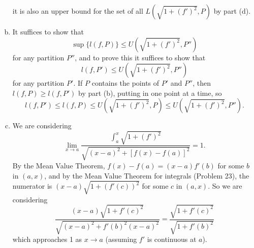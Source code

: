 \documentclass{article}
\begin{document}
\begin{enumerate}[(a)]
    it is also an upper bound for the set of all $L(\sqrt{1 + (f')^2}, P)$ by
    part (d).
  \item It suffices to show that \[
      \sup\{l(f, P)\} \leq U(\sqrt{1 + (f')^2}, P'')
    \] for any partition $P''$, and to prove this it suffices to show that \[
      l(f, P') \leq U(\sqrt{1 + (f')^2}, P'')
    \] for any partition $P'$. If $P$ contains the points of $P'$ and $P''$,
    then $l(f, P) \geq l(f, P')$ by part (b), putting in one point at a time,
    so \[
      l(f, P')
      \leq l(f, P)
      \leq U(\sqrt{1 + (f')^2}, P)
      \leq U(\sqrt{1 + (f')^2}, P'').
    \]
  \item We are considering \[
      \lim_{x \to a} \frac{\int_a^x \sqrt{1 + (f')^2}}{\sqrt{(x - a)^2 +
      [f(x) - f(a)]^2}} = 1.
    \] By the Mean Value Theorem, $f(x) - f(a) = (x - a)f'(b)$ for some $b$ in
    $(a, x)$, and by the Mean Value Theorem for integrals (Problem 23), the
    numerator is $(x - a)\sqrt{1 + (f'(c))^2}$ for some $c$ in $(a, x)$. So we
    are considering \[
      \frac{(x - a)\sqrt{1 + f'(c)^2}}{\sqrt{(x - a)^2 + f'(b)^2(x - a)^2}}
      = \frac{\sqrt{1 + f'(c)^2}}{\sqrt{1 + f'(b)^2}}
    \] which approaches 1 as $x \to a$ (assuming $f'$ is continuous at $a$).
\end{enumerate}
\end{document}
